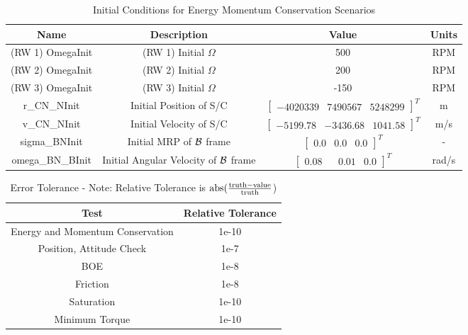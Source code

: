 \begin{table}[htbp]
	\caption{Initial Conditions for Energy Momentum Conservation Scenarios}
	\label{tab:initial}
	\centering \fontsize{10}{10}\selectfont
	\begin{tabular}{ c | c | c | c } %
		\hline
		\textbf{Name}  & \textbf{Description}  & \textbf{Value} & \textbf{Units} \\
		\hline
		(RW 1) OmegaInit  & (RW 1) Initial $\Omega$ & 500 & RPM \\
		(RW 2) OmegaInit  & (RW 2) Initial $\Omega$ & 200 & RPM \\
		(RW 3) OmegaInit  & (RW 3) Initial $\Omega$ & -150 & RPM \\
		r\_CN\_NInit & Initial Position of S/C & $\begin{bmatrix}
		-4020339 &	7490567 & 5248299 
		\end{bmatrix}^T$ & m \\
		v\_CN\_NInit & Initial Velocity of S/C & $\begin{bmatrix}
		-5199.78 & -3436.68 & 1041.58
		\end{bmatrix}^T$ & m/s \\
		sigma\_BNInit & Initial MRP of $\cal{B}$ frame & $\begin{bmatrix}
		0.0 & 0.0 & 0.0
		\end{bmatrix}^T$ & - \\
		omega\_BN\_BInit & Initial Angular Velocity of $\cal{B}$ frame & $\begin{bmatrix}
		0.08 & & 0.01 & 0.0
		\end{bmatrix}^T$ & rad/s \\
		\hline
	\end{tabular}
\end{table}

\begin{table}[htbp]
	\caption{Error Tolerance - Note: Relative Tolerance is $\textnormal{abs}(\frac{\textnormal{truth} - \textnormal{value}}{\textnormal{truth}}$)}
	\label{tab:errortol}
	\centering \fontsize{10}{10}\selectfont
	\begin{tabular}{| c | c |} %
		\hline
		Test   & Relative Tolerance \\
		\hline
		Energy and Momentum Conservation & 1e-10 \\
		\hline
		Position, Attitude Check & 1e-7 \\
		\hline
		BOE & 1e-8 \\
		\hline
		Friction & 1e-8 \\
		\hline
		Saturation & 1e-10 \\
		\hline
		Minimum Torque & 1e-10 \\
		\hline	
	\end{tabular}
\end{table}

